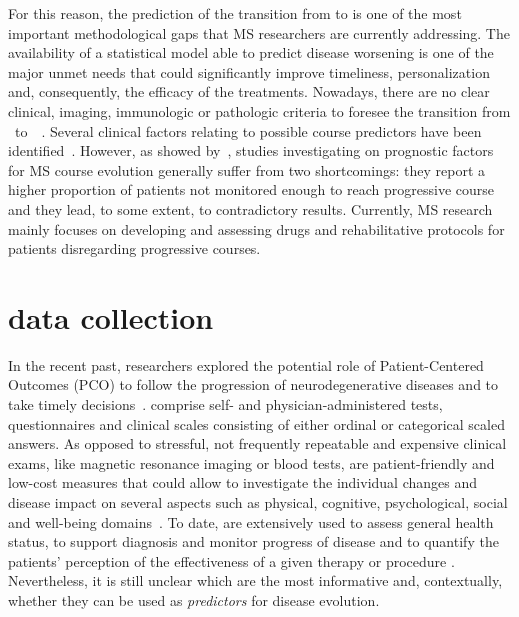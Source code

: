 
For this reason, the prediction of the transition from \RR to \SP is one of the most important methodological gaps that MS researchers are currently addressing.
The availability of a statistical model able to predict disease worsening is one of the major unmet needs that could significantly improve timeliness, personalization and, consequently, the efficacy of the treatments.
Nowadays, there are no clear clinical, imaging, immunologic or pathologic criteria to foresee the transition from \RR~to~\SP~\cite{lublin2014defining}. Several clinical factors relating to possible \SP course predictors have been identified~\cite{bergamaschi2015bremso, dickens2014type}.
However, as showed by~\cite{vukusic2003prognostic}, studies investigating on prognostic factors for MS course evolution generally suffer from two shortcomings: they
report a higher proportion of \RR patients not monitored enough to reach progressive course and they lead, to some extent, to contradictory results.
Currently, MS research mainly focuses on developing and assessing drugs and rehabilitative protocols for \RR patients disregarding progressive courses.

\section{\PCOs data collection}\label{sec:proms_data_collection}

In the recent past, researchers explored the potential role of Patient-Centered Outcomes (\ac{PCO}) to follow the progression of neurodegenerative diseases and to take timely decisions~\cite{black2013patient}. %
\PCOs comprise self- and physician-administered tests, questionnaires and clinical scales consisting of either ordinal or categorical scaled answers.
As opposed to stressful, not frequently repeatable and expensive clinical exams, like magnetic resonance imaging or blood tests, \PCOs are patient-friendly and low-cost measures that could allow to investigate the individual changes and disease impact on several aspects such as physical, cognitive, psychological, social and well-being domains~\cite{fiorini2015machine}.
To date, \PCOs are extensively used to assess general health status, to support diagnosis and monitor progress of disease and to quantify the patients' perception of the effectiveness of a given therapy or procedure \cite{nelson2015patient}.
Nevertheless, it is still unclear which are the most informative \PCOs and, contextually, whether they can be used as {\em predictors} for disease evolution.

